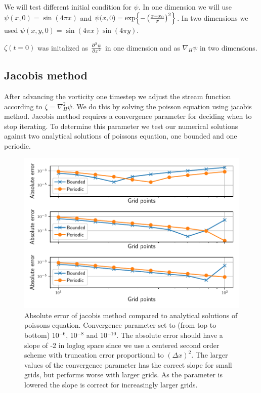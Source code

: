 We will test different initial condition for $\psi$.
In one dimension we will use $\psi(x, 0) = \sin{(4 \pi x)}$ and $\psi(x, 0) =
\exp{-\left(\frac{x - x_0}{\sigma}\right)^2}$.
In two dimensions we used $\psi(x,y,0) = \sin{(4 \pi x)} \sin{(4 \pi y)}$.


$ \zeta(t=0) $ was initalized as $ \pdv[2]{\psi}{x} $ in one dimension and as
$\nabla_H \psi$ in two dimensions.



\subsection{Jacobis method}

After advancing the vorticity one timestep we adjust the stream function
according to $\zeta = \nabla_H^2 \psi$.  We do this by solving the poisson
equation using
jacobis method. Jacobis method requires a convergence parameter for deciding
when to stop iterating. To determine this parameter we test our
numerical solutions  against two analytical solutions
of poissons equation, one bounded and one periodic.

\begin{figure}[h]
  \centering
  \includegraphics[width=\textwidth]{../figures/error_jacobi.pdf}
  \caption{Absolute error of jacobis method
  compared to analytical solutions of poissons equation. Convergence parameter set to (from top to bottom) 10$^{-6}$, 10$^{-8}$ and 10$^{-10}$.
  The absolute error should have a slope of -2 in loglog space since we use
  a centered second order scheme with truncation error proportional to $(\Delta x)^2$.
  The larger values of the convergence parameter has the correct slope for small
  grids, but performs worse with larger grids. As the parameter is lowered the
  slope is correct for increasingly larger grids.}
  \label{fig:error_jacobi}
\end{figure}

